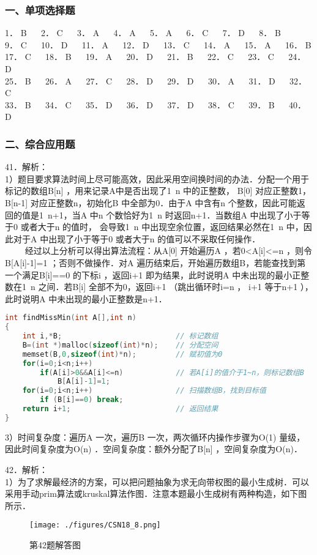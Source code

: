 \subsubsection{一、单项选择题}
1． B $\quad$ 2． C $\quad$ 3． A $\quad$ 4． A $\quad$ 5． A $\quad$ 6． C $\quad$ 7． D $\quad$ 8． B \\
9． C $\quad$ 10． D $\quad$ 11． A $\quad$ 12． D $\quad$ 13． C $\quad$ 14． A $\quad$ 15． A $\quad$ 16． B \\
17． C $\quad$ 18． B $\quad$ 19． A $\quad$ 20． D $\quad$ 21． B $\quad$ 22． C $\quad$ 23． C $\quad$ 24． D \\
25． B $\quad$ 26． A $\quad$ 27． C $\quad$ 28． D $\quad$ 29． D $\quad$ 30． A $\quad$ 31． D $\quad$ 32． C \\
33． B $\quad$ 34． C $\quad$ 35． D $\quad$ 36． D $\quad$ 37． D $\quad$ 38． C $\quad$ 39． B $\quad$ 40． D

\subsubsection{二、综合应用题}
41．解析： \\
1）题目要求算法时间上尽可能高效，因此采用空间换时间的办法．分配一个用于标记的数组B[n] ，用来记录A中是否出现了1~n 中的正整数， B[0] 对应正整数1，B[n-1] 对应正整数n，初始化B 中全部为0．由于A 中含有n 个整数，因此可能返回的值是1~n+1，当A 中n 个数恰好为1~n 时返回n+1．当数组A 中出现了小于等于0 或者大于n 的值时， 会导致1~n 中出现空余位置，返回结果必然在1~n 中，因此对于A 中出现了小于等于0 或者大于n 的值可以不采取任何操作． \\
$\qquad$ 经过以上分析可以得出算法流程：从A[0] 开始遍历A ，若0<A[i]<=n ，则令B[A[i]-1]=1 ；否则不做操作．对A 遍历结束后，开始遍历数组B，若能查找到第一个满足B[i]==0 的下标i ，返回i+1 即为结果，此时说明A 中未出现的最小正整数在1~n 之间．若B[i] 全部不为0，返回i+1 （跳出循环时i=n ， i+1 等于n+1 ），此时说明A 中未出现的最小正整数是n+1．
\begin{lstlisting}[language=cpp]
int findMissMin(int A[],int n)
{
    int i,*B;                          // 标记数组
    B=(int *)malloc(sizeof(int)*n);    // 分配空间
    memset(B,0,sizeof(int)*n);         // 赋初值为0
    for(i=0;i<n;i++)
        if(A[i]>0&&A[i]<=n)            // 若A[i]的值介于1~n，则标记数组B
            B[A[i]-1]=1;
    for(i=0;i<n;i++)                   // 扫描数组B，找到目标值
        if (B[i]==0) break;
    return i+1;                        // 返回结果
}
\end{lstlisting}
3）时间复杂度：遍历A 一次，遍历B 一次，两次循环内操作步骤为O(1) 量级，因此时间复杂度为O(n) ．空间复杂度：额外分配了B[n] ，空间复杂度为O(n)．

42．解析： \\
1）为了求解最经济的方案，可以把问题抽象为求无向带权图的最小生成树．可以采用手动prim算法或kruskal算法作图．注意本题最小生成树有两种构造，如下图所示．
\begin{figure}[ht]
\centering
\texttt{[image: ./figures/CSN18\_8.png]}
\caption{第42题解答图} \label{CSN18_fig8}
\end{figure}

